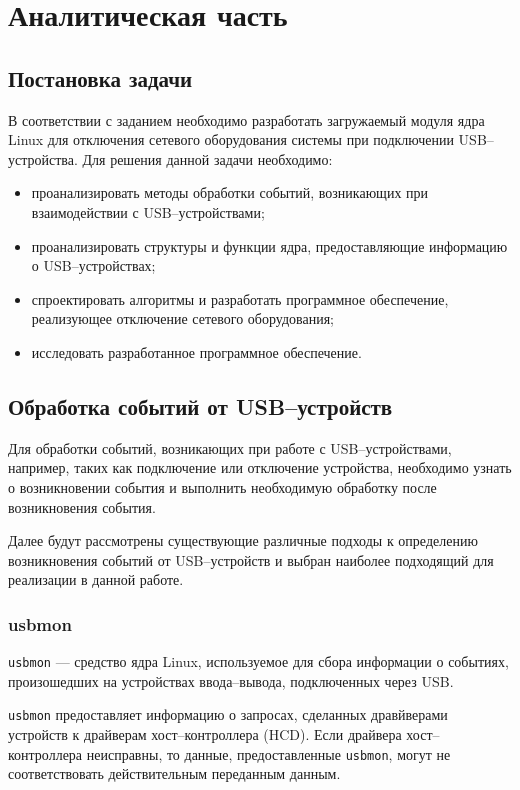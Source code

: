 \chapter{Аналитическая часть}

\section{Постановка задачи}

В соответствии с заданием необходимо разработать загружаемый модуля ядра Linux для отключения сетевого оборудования системы при подключении USB--устройства. Для решения данной задачи необходимо:
\begin{itemize}
	\item проанализировать методы обработки событий, возникающих при взаимодействии с USB--устройствами;
	\item проанализировать структуры и функции ядра, предоставляющие информацию о USB--устройствах;
	\item спроектировать алгоритмы и разработать программное обеспечение, реализующее отключение сетевого оборудования;
	\item исследовать разработанное программное обеспечение.
\end{itemize}

\section{Обработка событий от USB--устройств}

Для обработки событий, возникающих при работе с USB--устройствами, например, таких как подключение или отключение устройства, необходимо узнать о возникновении события и выполнить необходимую обработку после возникновения события.

Далее будут рассмотрены существующие различные подходы к определению возникновения событий от USB--устройств и выбран наиболее подходящий для реализации в данной работе.

\subsection{usbmon}

\texttt{usbmon} \cite{usbmon} --- средство ядра Linux, используемое для сбора информации о событиях, произошедших на устройствах ввода--вывода, подключенных через USB.

\texttt{usbmon} предоставляет информацию о запросах, сделанных дравйверами устройств к драйверам хост--контроллера (HCD). Если драйвера хост--контроллера неисправны, то данные, предоставленные \texttt{usbmon}, могут не соответствовать действительным переданным данным.

